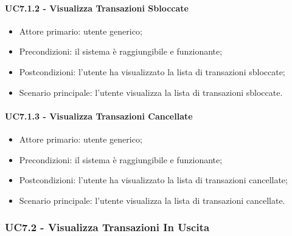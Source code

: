 \paragraph{UC7.1.2 - Visualizza Transazioni Sbloccate}

\begin{itemize}
    \item Attore primario: utente generico;
    \item Precondizioni: il sistema è raggiungibile e funzionante;
    \item Postcondizioni: l'utente ha visualizzato la lista di transazioni sbloccate;
    \item Scenario principale: l'utente visualizza la lista di transazioni sbloccate.
\end{itemize}

\paragraph{UC7.1.3 - Visualizza Transazioni Cancellate}

\begin{itemize}
    \item Attore primario: utente generico;
    \item Precondizioni: il sistema è raggiungibile e funzionante;
    \item Postcondizioni: l'utente ha visualizzato la lista di transazioni cancellate;
    \item Scenario principale: l'utente visualizza la lista di transazioni cancellate.
\end{itemize}

\subsubsection{UC7.2 - Visualizza Transazioni In Uscita}

